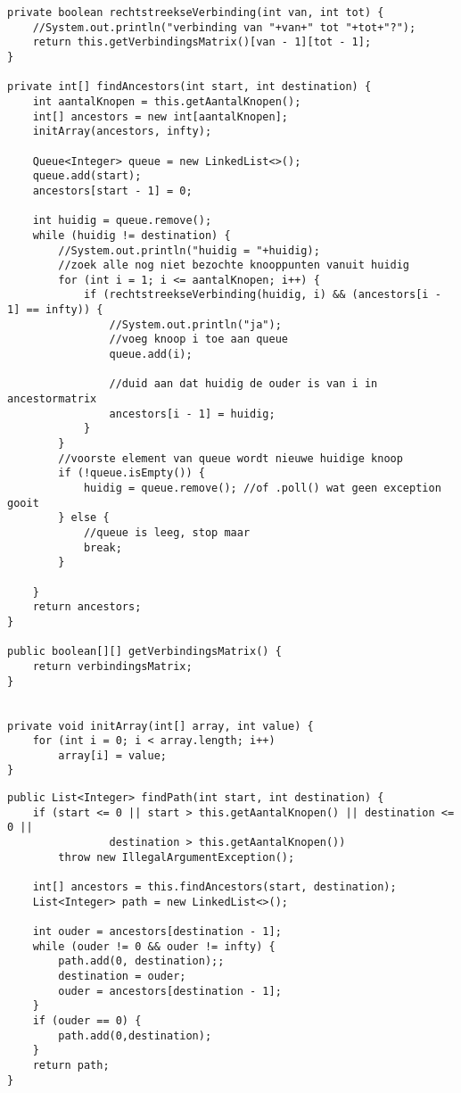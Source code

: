 \begin{Oplossing}{7.4}
\begin{lstlisting}[caption={findAncestors(int,int)}, label=BFSAncestors]
private boolean rechtstreekseVerbinding(int van, int tot) {
	//System.out.println("verbinding van "+van+" tot "+tot+"?");
	return this.getVerbindingsMatrix()[van - 1][tot - 1];
}

private int[] findAncestors(int start, int destination) {
	int aantalKnopen = this.getAantalKnopen();
	int[] ancestors = new int[aantalKnopen];
	initArray(ancestors, infty);

	Queue<Integer> queue = new LinkedList<>();
	queue.add(start);
	ancestors[start - 1] = 0;

	int huidig = queue.remove();
	while (huidig != destination) {
		//System.out.println("huidig = "+huidig);
		//zoek alle nog niet bezochte knooppunten vanuit huidig
		for (int i = 1; i <= aantalKnopen; i++) {
			if (rechtstreekseVerbinding(huidig, i) && (ancestors[i - 1] == infty)) {
				//System.out.println("ja");
				//voeg knoop i toe aan queue
				queue.add(i);
					
				//duid aan dat huidig de ouder is van i in ancestormatrix
				ancestors[i - 1] = huidig;
			}
		}
		//voorste element van queue wordt nieuwe huidige knoop
		if (!queue.isEmpty()) {
			huidig = queue.remove(); //of .poll() wat geen exception gooit
		} else {
			//queue is leeg, stop maar
			break;
		}
		
	}
	return ancestors;
}

public boolean[][] getVerbindingsMatrix() {
	return verbindingsMatrix;
}


private void initArray(int[] array, int value) {
	for (int i = 0; i < array.length; i++)
		array[i] = value;
}
\end{lstlisting}
\end{Oplossing}
\begin{Oplossing}{7.5}
\begin{lstlisting}[caption={findPath}, label=BFSfindPath]
public List<Integer> findPath(int start, int destination) {
	if (start <= 0 || start > this.getAantalKnopen() || destination <= 0 ||
				destination > this.getAantalKnopen())
		throw new IllegalArgumentException();

	int[] ancestors = this.findAncestors(start, destination);
	List<Integer> path = new LinkedList<>();

	int ouder = ancestors[destination - 1];
	while (ouder != 0 && ouder != infty) {
		path.add(0, destination);;
		destination = ouder;
		ouder = ancestors[destination - 1];
	}
	if (ouder == 0) {
		path.add(0,destination);
	}
	return path;
}
	\end{lstlisting}
\end{Oplossing}
